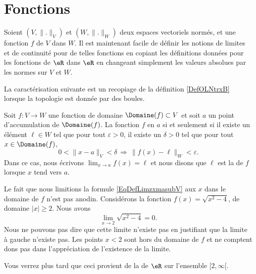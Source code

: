 \section{Fonctions}		\label{Sect_fonctions}

Soient $(V,\| . \|_V)$ et $(W,\| . \|_W)$ deux espaces vectoriels normés, et une fonction $f$ de $V$ dans $W$. Il est maintenant facile de définir les notions de limites et de continuité pour de telles fonctions en copiant les définitions données pour les fonctions de $\eR$ dans $\eR$ en changeant simplement les valeurs absolues par les normes sur $V$ et $W$.

La caractérisation suivante est un recopiage de la définition \ref{DefOLNtrxB} lorsque la topologie est donnée par des boules.
\begin{proposition}\label{PropHOCWooSzrMjl}
	Soit $f\colon V\to W$ une fonction de domaine \( \Domaine(f)\subset V\) et soit $a$ un point d'accumulation de $\Domaine(f)$. 
    La fonction \( f\) en $a$ si et seulement si il existe un élément $\ell\in W$ tel que pour tout $\varepsilon>0$, il existe un $\delta>0$ tel que pour tout $x\in \Domaine(f)$,
    \begin{equation}        \label{EqDefLimzxmasubV}
		0<\| x-a \|_V<\delta\,\Rightarrow\,\| f(x)-\ell \|_W<\varepsilon.
	\end{equation}
	Dans ce cas, nous écrivons $\lim_{x\to a} f(x)=\ell$ et nous disons que $\ell$ est la  de $f$ lorsque $x$ tend vers $a$.
\end{proposition}

\begin{remark}
    Le fait que nous limitions la formule \eqref{EqDefLimzxmasubV} aux \( x\) dans le domaine de \( f\) n'est pas anodin. Considérons la fonction \( f(x)=\sqrt{x^2-4}\), de domaine \( | x |\geq 2\). Nous avons
    \begin{equation}
        \lim_{x\to 2} \sqrt{x^2-4}=0.
    \end{equation}
    Nous ne pouvons pas dire que cette limite n'existe pas en justifiant que la limite à gauche n'existe pas. Les points \( x<2\) sont hors du domaine de \( f\) et ne comptent dons pas dans l'appréciation de l'existence de la limite.

    Vous verrez plus tard que ceci provient de la  de \( \eR\) sur l'ensemble \( \mathopen[ 2 , \infty [\).
\end{remark}



